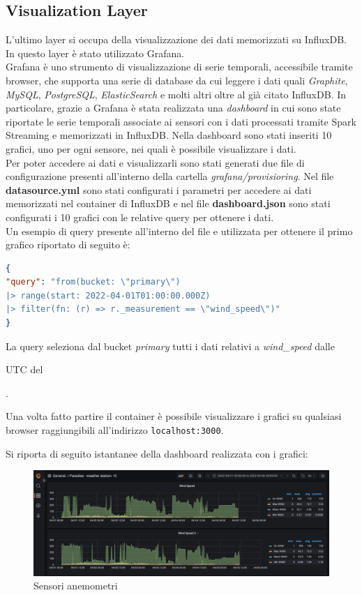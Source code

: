 \documentclass{article}
\begin{document}
\subsection{Visualization Layer}
L'ultimo layer si occupa della visualizzazione dei dati memorizzati su InfluxDB. In questo layer è stato utilizzato Grafana.\\ 
Grafana è uno strumento di visualizzazione di serie temporali, accessibile tramite browser, che supporta una serie di database da cui leggere i dati quali \textit{Graphite}, \textit{MySQL}, \textit{PostgreSQL}, \textit{ElasticSearch} e molti altri oltre al già citato InfluxDB.
In particolare, grazie a Grafana è stata realizzata una \textit{dashboard} in cui sono state riportate le serie temporali associate ai sensori con i dati processati tramite Spark Streaming e memorizzati in InfluxDB. Nella dashboard sono stati inseriti 10 grafici, uno per ogni sensore, nei quali è possibile visualizzare i dati.\\
Per poter accedere ai dati e visualizzarli sono stati generati due file di configurazione presenti all'interno della cartella \textit{grafana/provisioring}. Nel file \textbf{datasource.yml} sono stati configurati i parametri per accedere ai dati memorizzati nel container di InfluxDB e nel file \textbf{dashboard.json} sono stati configurati i 10 grafici con le relative query per ottenere i dati.\\
Un esempio di query presente all'interno del file e utilizzata per ottenere il primo grafico riportato di seguito è:
\begin{lstlisting}[language=json,firstnumber=1]
{
"query": "from(bucket: \"primary\") 
|> range(start: 2022-04-01T01:00:00.000Z)
|> filter(fn: (r) => r._measurement == \"wind_speed\")"
}
\end{lstlisting}
La query seleziona dal bucket \textit{primary} tutti i dati relativi a \textit{wind\_speed} dalle \date{01:00} UTC del \date{2022-04-01}.

Una volta fatto partire il container è possibile visualizzare i grafici su qualsiasi browser raggiungibili all'indirizzo \texttt{localhost:3000}.

\newpage

\noindent
Si riporta di seguito istantanee della dashboard realizzata con i grafici:
\begin{figure}[H]
\includegraphics[width=1\linewidth]{WindSpeed-Graph}
\centering
\caption*{Sensori anemometri}
\label{fig:bytepost}
\end{figure}
\end{document}
